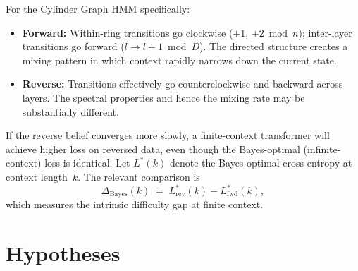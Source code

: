 \documentclass[11pt]{article}
\begin{document}
For the Cylinder Graph HMM specifically:
\begin{itemize}
  \item \textbf{Forward:} Within-ring transitions go clockwise ($+1$, $+2 \bmod n$); inter-layer transitions go forward ($l \to l+1 \bmod D$).  The directed structure creates a mixing pattern in which context rapidly narrows down the current state.
  \item \textbf{Reverse:} Transitions effectively go counterclockwise and backward across layers.  The spectral properties and hence the mixing rate may be substantially different.
\end{itemize}

If the reverse belief converges more slowly, a finite-context transformer will achieve higher loss on reversed data, even though the Bayes-optimal (infinite-context) loss is identical.  Let $L^{*}(k)$ denote the Bayes-optimal cross-entropy at context length~$k$.  The relevant comparison is
\begin{equation}
  \Delta_{\mathrm{Bayes}}(k)
  \;=\; L^{*}_{\mathrm{rev}}(k) - L^{*}_{\mathrm{fwd}}(k),
\end{equation}
which measures the intrinsic difficulty gap at finite context.

\section{Hypotheses}\label{sec:hypotheses}
\end{document}
